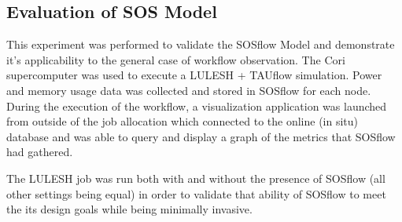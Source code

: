 \subsection{Evaluation of SOS Model} %
This experiment was performed to validate the SOSflow Model and
demonstrate it's applicability to the general case of workflow observation.
%
The Cori supercomputer was used to execute a LULESH + TAUflow simulation. 
%
Power and memory usage data was collected and stored in SOSflow for
each node.
%
During the execution of the workflow, a visualization application was
launched from outside of the job allocation which connected to the
online (in situ) database and was able to query and display a
graph of the metrics that SOSflow had gathered.
%
\par
%
The LULESH job was run both with and without the presence of SOSflow
(all other settings being equal) in order to validate that ability of
SOSflow to meet the its design goals while being minimally invasive.
%
%



